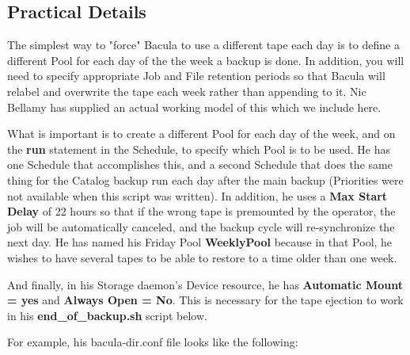 \subsection{Practical Details}

The simplest way to "force" Bacula to use a different tape each day is to
define a different Pool for each day of the the week a backup is done. In
addition, you will need to specify appropriate Job and File retention periods
so that Bacula will relabel and overwrite the tape each week rather than
appending to it. Nic Bellamy has supplied an actual working model of this
which we include here. 

What is important is to create a different Pool for each day of the week, and
on the {\bf run} statement in the Schedule, to specify which Pool is to be
used. He has one Schedule that accomplishes this, and a second Schedule that
does the same thing for the Catalog backup run each day after the main backup
(Priorities were not available when this script was written). In addition, he
uses a {\bf Max Start Delay} of 22 hours so that if the wrong tape is
premounted by the operator, the job will be automatically canceled, and the
backup cycle will re-synchronize the next day. He has named his Friday Pool
{\bf WeeklyPool} because in that Pool, he wishes to have several tapes to be
able to restore to a time older than one week. 

And finally, in his Storage daemon's Device resource, he has {\bf Automatic
Mount = yes} and {\bf Always Open = No}. This is necessary for the tape
ejection to work in his {\bf end\_of\_backup.sh} script below. 

For example, his bacula-dir.conf file looks like the following: 

